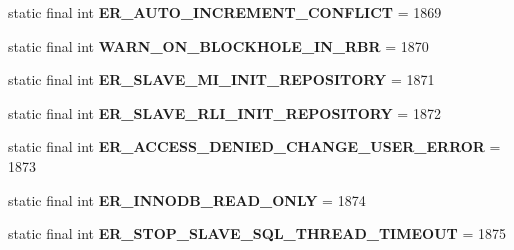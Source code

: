 \begin{DoxyCompactItemize}
static final int {\bfseries E\+R\+\_\+\+A\+U\+T\+O\+\_\+\+I\+N\+C\+R\+E\+M\+E\+N\+T\+\_\+\+C\+O\+N\+F\+L\+I\+CT} = 1869
\item 
\mbox{\label{classcom_1_1mysql_1_1cj_1_1exceptions_1_1_mysql_error_numbers_ac22f3f88f54f6cd942d24f901adeb221}} 
static final int {\bfseries W\+A\+R\+N\+\_\+\+O\+N\+\_\+\+B\+L\+O\+C\+K\+H\+O\+L\+E\+\_\+\+I\+N\+\_\+\+R\+BR} = 1870
\item 
\mbox{\label{classcom_1_1mysql_1_1cj_1_1exceptions_1_1_mysql_error_numbers_a5196649ae7f05ede59a2b1dc373129e8}} 
static final int {\bfseries E\+R\+\_\+\+S\+L\+A\+V\+E\+\_\+\+M\+I\+\_\+\+I\+N\+I\+T\+\_\+\+R\+E\+P\+O\+S\+I\+T\+O\+RY} = 1871
\item 
\mbox{\label{classcom_1_1mysql_1_1cj_1_1exceptions_1_1_mysql_error_numbers_a4c1a310fbc502ef6d4297c7459c0075a}} 
static final int {\bfseries E\+R\+\_\+\+S\+L\+A\+V\+E\+\_\+\+R\+L\+I\+\_\+\+I\+N\+I\+T\+\_\+\+R\+E\+P\+O\+S\+I\+T\+O\+RY} = 1872
\item 
\mbox{\label{classcom_1_1mysql_1_1cj_1_1exceptions_1_1_mysql_error_numbers_ad159ee326f47a0792f58d96347758526}} 
static final int {\bfseries E\+R\+\_\+\+A\+C\+C\+E\+S\+S\+\_\+\+D\+E\+N\+I\+E\+D\+\_\+\+C\+H\+A\+N\+G\+E\+\_\+\+U\+S\+E\+R\+\_\+\+E\+R\+R\+OR} = 1873
\item 
\mbox{\label{classcom_1_1mysql_1_1cj_1_1exceptions_1_1_mysql_error_numbers_aeb5f9589160f2184f1bac43a8cdcb222}} 
static final int {\bfseries E\+R\+\_\+\+I\+N\+N\+O\+D\+B\+\_\+\+R\+E\+A\+D\+\_\+\+O\+N\+LY} = 1874
\item 
\mbox{\label{classcom_1_1mysql_1_1cj_1_1exceptions_1_1_mysql_error_numbers_a0a9f4ed6972ff67a68c5d10016bac26b}} 
static final int {\bfseries E\+R\+\_\+\+S\+T\+O\+P\+\_\+\+S\+L\+A\+V\+E\+\_\+\+S\+Q\+L\+\_\+\+T\+H\+R\+E\+A\+D\+\_\+\+T\+I\+M\+E\+O\+UT} = 1875
\item 
\mbox{\label{classcom_1_1mysql_1_1cj_1_1exceptions_1_1_mysql_error_numbers_ad92efc3710e4317ce886e781f9be20ec}} 

\end{DoxyCompactItemize}
